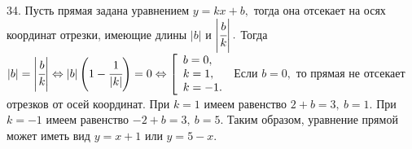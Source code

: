 34. Пусть прямая задана уравнением $y=kx+b,$ тогда она отсекает на осях координат отрезки, имеющие длины $|b|$ и $\left|\cfrac{b}{k}\right|.$ Тогда
$|b|=\left|\cfrac{b}{k}\right|\Leftrightarrow |b|\left(1-\cfrac{1}{|k|}\right)=0\Leftrightarrow
\left[\begin{array}{l}b=0,\\ k=1,\\ k=-1.\end{array}\right.$ Если $b=0,$ то прямая не отсекает отрезков от осей координат. При $k=1$ имеем равенство $2+b=3,\ b=1.$
При $k=-1$ имеем равенство $-2+b=3,\ b=5.$ Таким образом, уравнение прямой может иметь вид $y=x+1$ или $y=5-x.$\\
